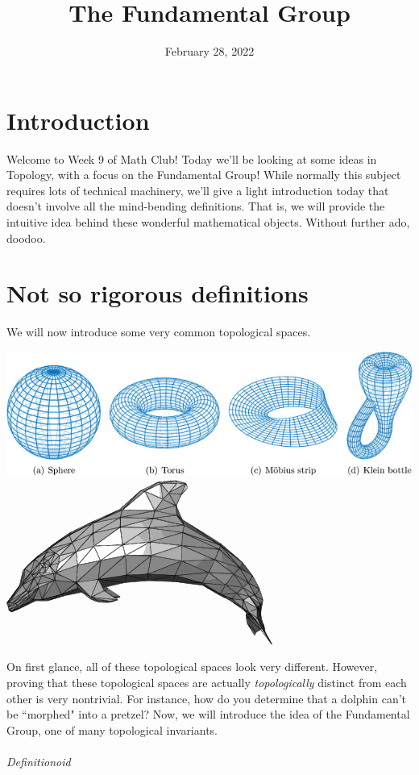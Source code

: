 \documentclass{article}
\title{The Fundamental Group}
\author{}
\date{February 28, 2022}
\begin{document}
\section{Introduction}
Welcome to Week 9 of Math Club! Today we'll be looking at some ideas in Topology, with a focus on the Fundamental Group! While normally this subject requires lots of technical machinery, we'll give a light introduction today that doesn't involve all the mind-bending definitions. That is, we will provide the intuitive idea behind these wonderful mathematical objects. Without further ado, doodoo.

\section{Not so rigorous definitions}
We will now introduce some very common topological spaces. 
\begin{center}
\includegraphics[scale=0.7]{Pics/sotrue} \quad \includegraphics[scale=0.35]{Pics/dolp}\\
\end{center}
On first glance, all of these topological spaces look very different. However, proving that these topological spaces are actually 
\emph{topologically} distinct from each other is very nontrivial. For instance, how do you determine that a dolphin can't be ``morphed" into a pretzel? Now, we will introduce the idea of the Fundamental Group, one of many topological invariants. \\\\
\emph{Definitionoid} \\
\end{document}
